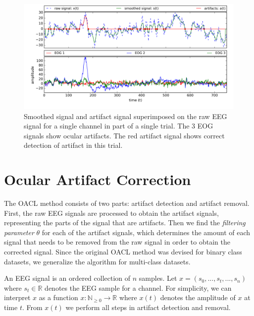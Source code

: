 \begin{figure}%
	\centering
	\includegraphics[width=1\textwidth]{figures/oacl-signals.png}
	\vspace{-2em}
	\caption{Smoothed signal and artifact signal superimposed on the raw EEG signal for a single channel in part of a single trial. The 3 EOG signals show ocular artifacts. The red artifact signal shows correct detection of artifact in this trial.}
	\label{fig:oacl-signals}
\end{figure}
\section{Ocular Artifact Correction}\label{sec:oacl}
The OACL method consists of two parts: artifact detection and artifact removal. First, the raw EEG signals are processed to obtain the artifact signals, representing the parts of the signal that are artifacts. Then we find the \emph{filtering parameter} $\theta$ for each of the artifact signals, which determines the amount of each signal that needs to be removed from the raw signal in order to obtain the corrected signal. 
Since the original OACL method \citep{li2015ocular} was devised for binary class datasets, we generalize the algorithm for multi-class datasets. 

An EEG signal is an ordered collection of $n$ samples. Let $x = (s_0,...,s_t,...,s_n)$ where $s_t \in \mathbb{R}$ denotes the EEG sample for a channel. For simplicity, we can interpret $x$ as a function $x : \mathbb{N}_{\geq 0} \rightarrow \mathbb{R}$ where $x(t)$ denotes the amplitude of $x$ at time $t$. 
From $x(t)$ we perform all steps in artifact detection and removal.


